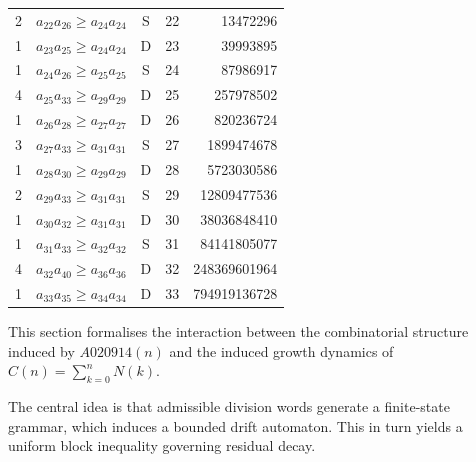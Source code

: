 \documentclass[12pt, oneside]{article}
\numberwithin{equation}{section}
\theoremstyle{definition}
\theoremstyle{plain}
\theoremstyle{remark}
\begin{document}
\begin{table}[htbp]
\begin{tabular}{@{}rccrr@{}}
2 & $a_{22} a_{26} \ge a_{24} a_{24}$ & S & 22 &     13472296 \\
1 & $a_{23} a_{25} \ge a_{24} a_{24}$ & D & 23 &     39993895 \\
1 & $a_{24} a_{26} \ge a_{25} a_{25}$ & S & 24 &     87986917 \\
4 & $a_{25} a_{33} \ge a_{29} a_{29}$ & D & 25 &    257978502 \\
1 & $a_{26} a_{28} \ge a_{27} a_{27}$ & D & 26 &    820236724 \\
3 & $a_{27} a_{33} \ge a_{31} a_{31}$ & S & 27 &   1899474678 \\
1 & $a_{28} a_{30} \ge a_{29} a_{29}$ & D & 28 &   5723030586 \\
2 & $a_{29} a_{33} \ge a_{31} a_{31}$ & S & 29 &  12809477536 \\
1 & $a_{30} a_{32} \ge a_{31} a_{31}$ & D & 30 &  38036848410 \\
1 & $a_{31} a_{33} \ge a_{32} a_{32}$ & S & 31 &  84141805077 \\
4 & $a_{32} a_{40} \ge a_{36} a_{36}$ & D & 32 & 248369601964 \\
1 & $a_{33} a_{35} \ge a_{34} a_{34}$ & D & 33 & 794919136728 \\
\bottomrule
\end{tabular}
\end{table}

This section formalises the interaction between the combinatorial
structure induced by $A020914(n)$ and the induced growth dynamics
of $C(n) = \sum_{k=0}^n N(k)$.

The central idea is that admissible division words generate a
finite-state grammar, which induces a bounded drift automaton.
This in turn yields a uniform block inequality governing residual decay.

\clearpage


\end{document}
